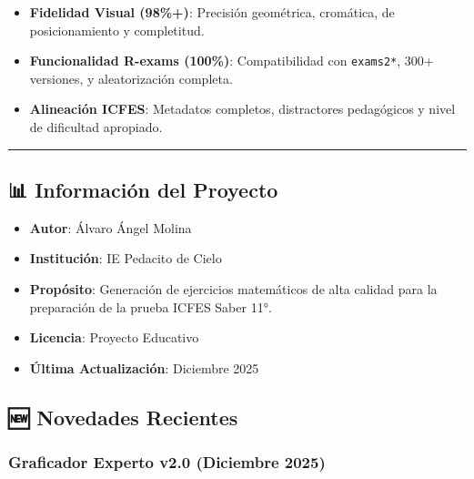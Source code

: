 \documentclass[
]{article}
\providecommand{\tightlist}{%
  \setlength{\itemsep}{0pt}\setlength{\parskip}{0pt}}
\begin{document}
\begin{itemize}
\tightlist
\item
  \textbf{Fidelidad Visual (98\%+)}: Precisión geométrica, cromática, de
  posicionamiento y completitud.
\item
  \textbf{Funcionalidad R-exams (100\%)}: Compatibilidad con
  \texttt{exams2*}, 300+ versiones, y aleatorización completa.
\item
  \textbf{Alineación ICFES}: Metadatos completos, distractores
  pedagógicos y nivel de dificultad apropiado.
\end{itemize}

\begin{center}\rule{0.5\linewidth}{0.5pt}\end{center}

\subsection{\texorpdfstring{📊 \textbf{Información del
Proyecto}}{📊 Información del Proyecto}}\label{informaciuxf3n-del-proyecto}

\begin{itemize}
\tightlist
\item
  \textbf{Autor}: Álvaro Ángel Molina
\item
  \textbf{Institución}: IE Pedacito de Cielo
\item
  \textbf{Propósito}: Generación de ejercicios matemáticos de alta
  calidad para la preparación de la prueba ICFES Saber 11°.
\item
  \textbf{Licencia}: Proyecto Educativo
\item
  \textbf{Última Actualización}: Diciembre 2025
\end{itemize}

\subsection{\texorpdfstring{🆕 \textbf{Novedades
Recientes}}{🆕 Novedades Recientes}}\label{novedades-recientes}

\subsubsection{Graficador Experto v2.0 (Diciembre
2025)}\label{graficador-experto-v2.0-diciembre-2025}
\end{document}
